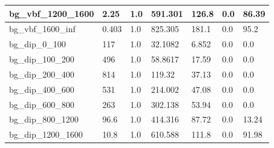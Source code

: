 \documentclass[a4paper, 10pt]{article}
\begin{document}
\begin{table}[H]
\begin{center}
\begin{tabular}{|m{23.0mm}|m{23.0mm}|m{18.0mm}|m{19.0mm}|m{19.0mm}|m{19.0mm}|m{19.0mm}|}
      \hline
      {\cellcolor{white}         bg\_vbf\_1200\_1600}& {\cellcolor{white}         2.25}& {\cellcolor{white}         1.0}& {\cellcolor{white}         591.301}& {\cellcolor{white}         126.8}& {\cellcolor{red}         0.0}& {\cellcolor{red}         86.39}\\
      \hline
      {\cellcolor{white}         bg\_vbf\_1600\_inf}& {\cellcolor{white}         0.403}& {\cellcolor{white}         1.0}& {\cellcolor{white}         825.305}& {\cellcolor{white}         181.1}& {\cellcolor{red}         0.0}& {\cellcolor{red}         95.2}\\
      \hline
      {\cellcolor{white}         bg\_dip\_0\_100}& {\cellcolor{white}         117}& {\cellcolor{white}         1.0}& {\cellcolor{white}         32.1082}& {\cellcolor{white}         6.852}& {\cellcolor{green}         0.0}& {\cellcolor{green}         0.0}\\
      \hline
      {\cellcolor{white}         bg\_dip\_100\_200}& {\cellcolor{white}         496}& {\cellcolor{white}         1.0}& {\cellcolor{white}         58.8617}& {\cellcolor{white}         17.59}& {\cellcolor{green}         0.0}& {\cellcolor{green}         0.0}\\
      \hline
      {\cellcolor{white}         bg\_dip\_200\_400}& {\cellcolor{white}         814}& {\cellcolor{white}         1.0}& {\cellcolor{white}         119.32}& {\cellcolor{white}         37.13}& {\cellcolor{green}         0.0}& {\cellcolor{green}         0.0}\\
      \hline
      {\cellcolor{white}         bg\_dip\_400\_600}& {\cellcolor{white}         531}& {\cellcolor{white}         1.0}& {\cellcolor{white}         214.002}& {\cellcolor{white}         47.08}& {\cellcolor{green}         0.0}& {\cellcolor{green}         0.0}\\
      \hline
      {\cellcolor{white}         bg\_dip\_600\_800}& {\cellcolor{white}         263}& {\cellcolor{white}         1.0}& {\cellcolor{white}         302.138}& {\cellcolor{white}         53.94}& {\cellcolor{green}         0.0}& {\cellcolor{green}         0.0}\\
      \hline
      {\cellcolor{white}         bg\_dip\_800\_1200}& {\cellcolor{white}         96.6}& {\cellcolor{white}         1.0}& {\cellcolor{white}         414.316}& {\cellcolor{white}         87.72}& {\cellcolor{orange}         0.0}& {\cellcolor{orange}         13.24}\\
      \hline
      {\cellcolor{white}         bg\_dip\_1200\_1600}& {\cellcolor{white}         10.8}& {\cellcolor{white}         1.0}& {\cellcolor{white}         610.588}& {\cellcolor{white}         111.8}& {\cellcolor{red}         0.0}& {\cellcolor{red}         91.98}\\

\end{tabular}
\end{center}
\end{table}
\end{document}
